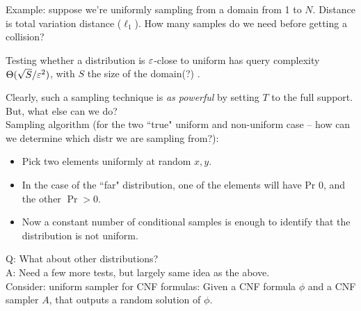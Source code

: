 Example: suppose we're uniformly sampling from a domain from 1 to $N$. Distance is total variation distance ($\ell_1$). How many samples do we need before getting a collision?\\

\begin{theorem}
Testing whether a distribution is $\varepsilon$-close to uniform has query complexity $\Theta(\sqrt{S}/\varepsilon^2)$, with $S$ the size of the domain(?) .
\end{theorem}


Clearly, such a sampling technique is {\it as powerful} by setting $T$ to the full support. But, what else can we do? \\

Sampling algorithm (for the two ``true" uniform and non-uniform case -- how can we determine which distr we are sampling from?):
\begin{itemize}
    \item Pick two elements uniformly at random $x,y$.
    \item In the case of the ``far" distribution, one of the elements will have Pr $0$, and the other $\Pr > 0$.
    \item Now a constant number of conditional samples is enough to identify that the distribution is not uniform.
\end{itemize}


Q: What about other distributions? \\

A: Need a few more tests, but largely same idea as the above. \\

Consider: uniform sampler for CNF formulas: Given a CNF formula $\phi$ and a CNF sampler $A$, that outputs a random solution of $\phi$.


